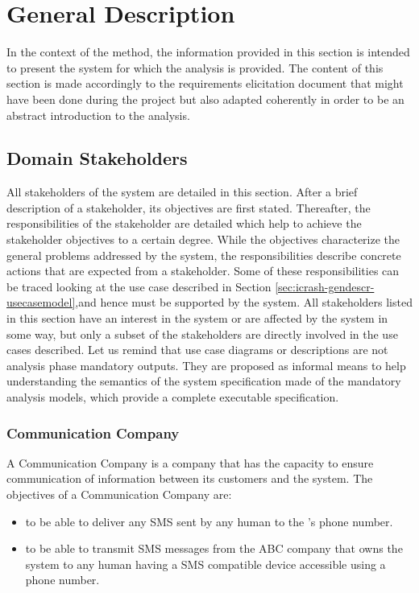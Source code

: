 
\chapter{General Description}
\label{chap:general_description}

In the context of the \msrmessir method, the information provided in this section is intended to present the system for which the \msrmessir analysis is provided. The content of this section is made accordingly to the requirements elicitation document that might have been done during the project but also adapted coherently in order to be an abstract introduction to the \msrmessir analysis.

\section{Domain Stakeholders}
\label{sec:icrash-gendescr-stakeholders}

All stakeholders of the system are detailed in this section. After a brief description of a
stakeholder, its objectives are first stated. Thereafter, the responsibilities of
the stakeholder are detailed which help to achieve the stakeholder objectives to a certain
degree. While the objectives characterize the general problems addressed by the \msricrash system,
the responsibilities describe concrete actions that are expected from a stakeholder. Some of
these responsibilities can be traced looking at the use case described in Section \ref{sec:icrash-gendescr-usecasemodel},and hence must be supported by the \msricrash  system. 
All stakeholders listed in this section have an interest in the system or are affected
by the system in some way, but only a subset of the stakeholders are directly involved in the use
cases described.
Let us remind that use case diagrams or descriptions are not \msrmessir analysis phase mandatory outputs. They are proposed as informal means to help understanding the semantics of the system specification made of the mandatory analysis models, which provide a complete executable specification.

\subsection{Communication Company}
A Communication Company is a company that has the capacity to ensure communication of information between its customers and the \msricrash system. 
The objectives of a Communication Company are:
\begin{itemize}
  \item to be able to deliver any SMS sent by any human to the \msricrash's phone number.
  \item to be able to transmit SMS messages from the ABC company that owns the \msricrash system to any human having a SMS compatible device accessible using a phone number.
\end{itemize}
\vspace{0.5cm}

